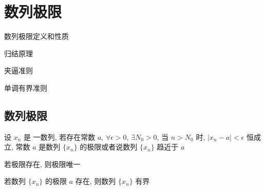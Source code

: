 
\chapter{数列极限}
\begin{introduction}
	\item 数列极限定义和性质
	\item 归结原理
	\item 夹逼准则
	\item 单调有界准则
\end{introduction}
\section{数列极限}
\begin{definition}[数列极限]
	设 $x_{n}$ 是 一数列, 若存在常数 $a$, $\forall \epsilon>0$, $\exists N_{0}>0$, 当 $n>N_{0}$ 时, $|x_{n}-a|<\epsilon$ 恒成立, 常数 $a$ 是数列 $\{x_{n}\}$ 的极限或者说数列 $\{x_{n}\}$ 趋近于 $a$
\end{definition}


\begin{corollary}[唯一性]
	若极限存在, 则极限唯一
\end{corollary}

\begin{corollary}[有界性]
	若数列 $\{x_{n}\}$ 的极限 $a$ 存在, 则数列 $\{x_{n}\}$ 有界
\end{corollary}


